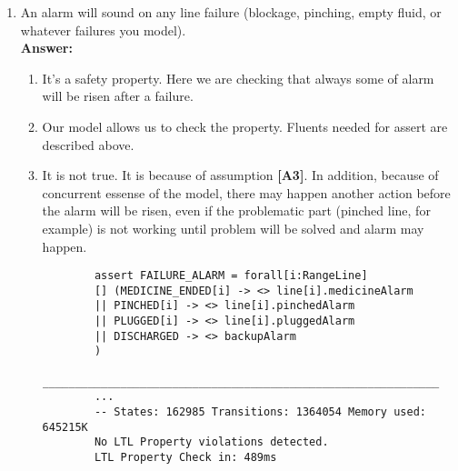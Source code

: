 \documentclass{article}
\begin{document}
\begin{enumerate}
    \item An alarm will sound on any line failure (blockage, pinching, empty fluid, or whatever failures you model). \\
    \textbf{Answer:}
    \begin{enumerate}
    	\item It's a safety property. Here we are checking that always some of alarm will be risen after a failure.
		\item Our model allows us to check the property. Fluents needed for assert are described above. 
		\item It is not true. It is because of assumption \textbf{[A3]}. In addition, because of concurrent essense of the model, there may happen another action before the alarm will be risen, even if the problematic part (pinched line, for example) is not working until problem will be solved and alarm may happen.
		\begin{verbatim}
		assert FAILURE_ALARM = forall[i:RangeLine] 
		[] (MEDICINE_ENDED[i] -> <> line[i].medicineAlarm 
		|| PINCHED[i] -> <> line[i].pinchedAlarm
		|| PLUGGED[i] -> <> line[i].pluggedAlarm
		|| DISCHARGED -> <> backupAlarm
		)
		_____________________________________________________________
		...
		-- States: 162985 Transitions: 1364054 Memory used: 645215K
		No LTL Property violations detected.
		LTL Property Check in: 489ms

		\end{verbatim}
	\end{enumerate}
	

\end{enumerate}
\end{document}
